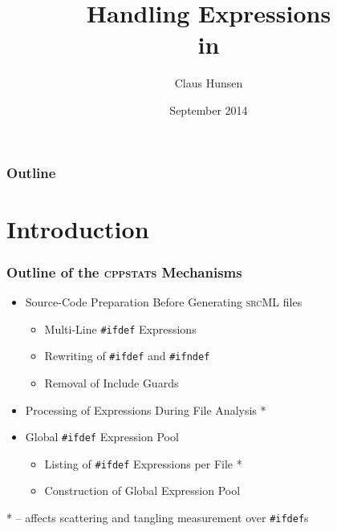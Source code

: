 \documentclass{beamer}
\title[Handling \ifdef Expressions in \cppstats]{Handling \ifdef Expressions\\in \cppstats}
\author[Claus Hunsen]{Claus Hunsen}
\institute{University of Passau}
\date[September 2014]{September 2014}
\newcommand\code[1]{\texttt{#1}}
\newcommand\tool[1]{\textsc{#1}}
\newcommand\ifdeff[1]{\code{\##1}\xspace}
\newcommand\ifdef[0]{{\upshape\ifdeff{ifdef}}\xspace}
\newcommand\ifdefs[0]{\ifdef{}s\xspace}
\newcommand\cppstats[0]{\tool{cppstats}\xspace}
\begin{document}
   
\begin{frame}[plain]
  \titlepage
\end{frame} 

\begin{frame}
  \frametitle{Outline} %
  \tableofcontents  
\end{frame} 


\section[Introduction]{Introduction}


\begin{frame}
\frametitle{Outline of the \cppstats Mechanisms}

\begin{itemize}
\item Source-Code Preparation Before Generating \tool{srcML} files
	\begin{itemize}
	\item Multi-Line \ifdef Expressions
	\item Rewriting of \ifdeff{ifdef} and \ifdeff{ifndef}
	\item Removal of Include Guards
	\end{itemize}
\item Processing of Expressions During File Analysis \textcolor{colorPassauAlert}{*}
\item Global \ifdef Expression Pool
	\begin{itemize}
	\item Listing of \ifdef Expressions per File \textcolor{colorPassauAlert}{*}
	\item Construction of Global Expression Pool
	\end{itemize}
\end{itemize}

\vfill

\textcolor{colorPassauAlert}{*} -- affects scattering and tangling measurement over \ifdefs

\end{frame}
\end{document}
